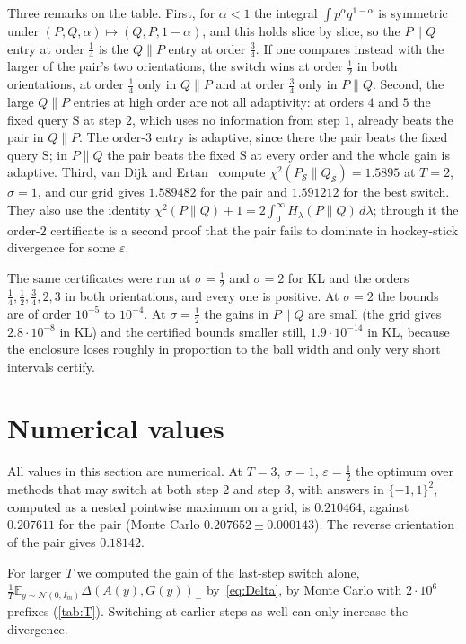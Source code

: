 \documentclass[11pt]{amsart}
\theoremstyle{definition}
\theoremstyle{remark}
\newcommand{\N}{\mathcal N}
\newcommand{\E}{\mathbb E}
\newcommand{\SAME}{\mathrm{S}}
\begin{document}
Three remarks on the table. First, for $\alpha<1$ the integral $\int p^\alpha q^{1-\alpha}$ is symmetric under $(P,Q,\alpha)\mapsto(Q,P,1-\alpha)$, and this holds slice by slice, so the $P\|Q$ entry at order $\frac14$ is the $Q\|P$ entry at order $\frac34$. If one compares instead with the larger of the pair's two orientations, the switch wins at order $\frac12$ in both orientations, at order $\frac14$ only in $Q\|P$ and at order $\frac34$ only in $P\|Q$. Second, the large $Q\|P$ entries at high order are not all adaptivity: at orders $4$ and $5$ the fixed query $\SAME$ at step $2$, which uses no information from step $1$, already beats the pair in $Q\|P$. The order-$3$ entry is adaptive, since there the pair beats the fixed query $\SAME$; in $P\|Q$ the pair beats the fixed $\SAME$ at every order and the whole gain is adaptive. Third, van Dijk and Ertan~\cite[Appendix~J]{vDE26} compute $\chi^2(P_{\mathcal S}\|Q_{\mathcal S})=1.5895$ at $T=2$, $\sigma=1$, and our grid gives $1.589482$ for the pair and $1.591212$ for the best switch. They also use the identity $\chi^2(P\|Q)+1=2\int_0^\infty H_\lambda(P\|Q)\,d\lambda$; through it the order-$2$ certificate is a second proof that the pair fails to dominate in hockey-stick divergence for some $\varepsilon$.

The same certificates were run at $\sigma=\frac12$ and $\sigma=2$ for KL and the orders $\frac14,\frac12,\frac34,2,3$ in both orientations, and every one is positive. At $\sigma=2$ the bounds are of order $10^{-5}$ to $10^{-4}$. At $\sigma=\frac12$ the gains in $P\|Q$ are small (the grid gives $2.8\cdot10^{-8}$ in KL) and the certified bounds smaller still, $1.9\cdot10^{-14}$ in KL, because the enclosure loses roughly in proportion to the ball width and only very short intervals certify.

\section{Numerical values}\label{sec:numerics}

All values in this section are numerical. At $T=3$, $\sigma=1$, $\varepsilon=\frac12$ the optimum over methods that may switch at both step $2$ and step $3$, with answers in $\{-1,1\}^2$, computed as a nested pointwise maximum on a grid, is $0.210464$, against $0.207611$ for the pair (Monte Carlo $0.207652\pm0.000143$). The reverse orientation of the pair gives $0.18142$.

For larger $T$ we computed the gain of the last-step switch alone, $\frac1T\E_{y\sim\N(0,I_m)}\Delta(A(y),G(y))_+$ by~\eqref{eq:Delta}, by Monte Carlo with $2\cdot10^6$ prefixes (\cref{tab:T}). Switching at earlier steps as well can only increase the divergence.
\end{document}
